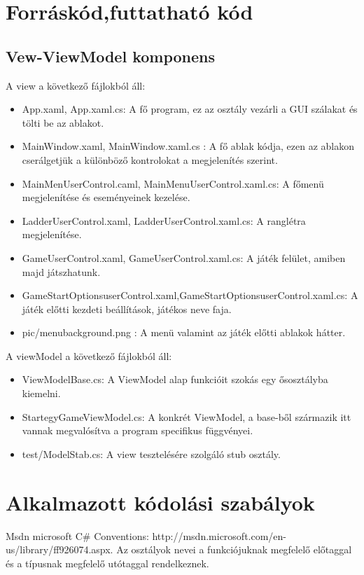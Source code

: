 \documentclass[a4paper,12pt]{report}
\begin{document}
\section{Forráskód,futtatható kód}

\subsection{Vew-ViewModel komponens}
A view a következő fájlokból áll:
\begin{itemize}
\item App.xaml, App.xaml.cs: A fő program, ez az osztály vezárli a GUI szálakat és tölti be az ablakot.
\item MainWindow.xaml, MainWindow.xaml.cs : A fő ablak kódja, ezen az ablakon cserálgetjük a különböző kontrolokat a megjelenítés  szerint.
\item MainMenUserControl.caml, MainMenuUserControl.xaml.cs: A főmenü megjelenítése és eseményeinek kezelése.
\item LadderUserControl.xaml, LadderUserControl.xaml.cs: A ranglétra megjelenítése.
\item GameUserControl.xaml, GameUserControl.xaml.cs: A játék felület, amiben majd játszhatunk.
\item GameStartOptionsuserControl.xaml,GameStartOptionsuserControl.xaml.cs: A játék előtti kezdeti beállítások, játékos neve faja.
\item pic/menubackground.png : A menü valamint az játék előtti ablakok hátter.
\end{itemize}

A viewModel a következő fájlokból áll:
\begin{itemize}
\item ViewModelBase.cs: A ViewModel alap funkcióit szokás egy ősosztályba kiemelni. 
\item StartegyGameViewModel.cs: A konkrét ViewModel, a base-ből származik itt vannak megvalósítva a program specifikus függvényei.
\item test/ModelStab.cs: A view tesztelésére szolgáló stub osztály.
\end{itemize}

\section{Alkalmazott kódolási szabályok}

Msdn microsoft C\# Conventions: http://msdn.microsoft.com/en-us/library/ff926074.aspx. Az osztályok nevei a funkciójuknak megfelelő előtaggal és a típusnak megfelelő utótaggal rendelkeznek.
\end{document}

